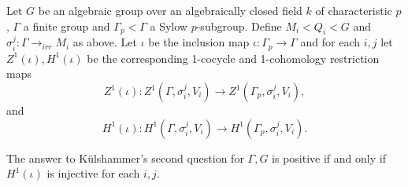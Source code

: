 \begin{theorem}
  Let $G$ be an algebraic group over an algebraically closed field $k$ of characteristic $p$, $\Gamma$ a finite group and $\Gamma_p < \Gamma$ a Sylow $p$-subgroup. Define $M_i < Q_i < G$ and $\sigma_i^{j}:\Gamma \rightarrow_{irr} M_{i}$ as above. Let $\iota$ be the inclusion map $\iota : \Gamma_p \rightarrow \Gamma$ and for each $i,j$ let $Z^1(\iota), H^1(\iota)$ be the corresponding 1-cocycle and 1-cohomology restriction maps
  \begin{displaymath}
    Z^1(\iota) : Z^1(\Gamma, \sigma_i^j, V_i) \rightarrow Z^1(\Gamma_p, \sigma_i^j, V_i),
  \end{displaymath}
  and
  \begin{displaymath}
    H^1(\iota) : H^1(\Gamma, \sigma_i^j, V_i) \rightarrow H^1(\Gamma_p, \sigma_i^j, V_i).
  \end{displaymath}
  
  The answer to K\"ulshammer's second question for $\Gamma, G$ is positive if and only if $H^1(\iota)$ is injective for each $i,j$.
  \label{k2_h1}
\end{theorem}
